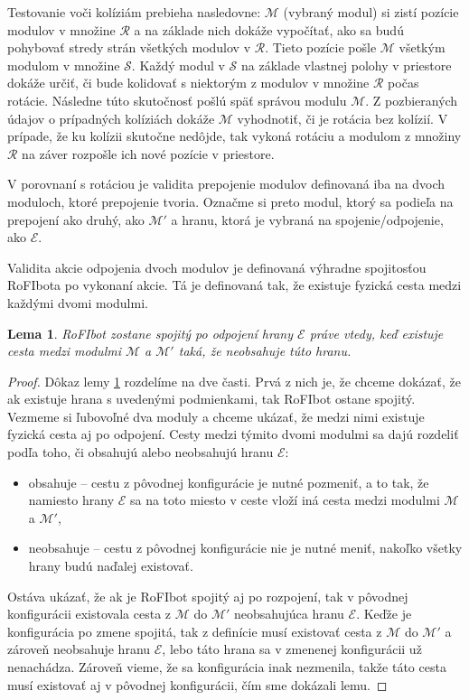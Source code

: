 \documentclass[
  digital, %
  oneside, %
  notable,   %
  lof,     %
  nolot,     %
]{fithesis3}
\newtheorem{lemma}{Lema}
\begin{document}
Testovanie voči kolíziám prebieha nasledovne: $\mathcal{M}$ (vybraný modul) si zistí pozície modulov v množine $\mathcal{R}$ a na základe nich dokáže vypočítať, ako sa budú pohybovať stredy strán všetkých modulov v $\mathcal{R}$. Tieto pozície pošle $\mathcal{M}$ všetkým modulom v množine $\mathcal{S}$. Každý modul v $\mathcal{S}$ na základe vlastnej polohy v priestore dokáže určiť, či bude kolidovať s niektorým z modulov v množine $\mathcal{R}$ počas rotácie. Následne túto skutočnosť pošlú späť správou modulu $\mathcal{M}$. Z pozbieraných údajov o prípadných kolíziách dokáže $\mathcal{M}$ vyhodnotiť, či je rotácia bez kolízií. V prípade, že ku kolízii skutočne nedôjde, tak vykoná rotáciu a modulom z množiny $\mathcal{R}$ na záver rozpošle ich nové pozície v priestore. 

V porovnaní s rotáciou je validita prepojenie modulov definovaná iba na dvoch moduloch, ktoré prepojenie tvoria. Označme si preto modul, ktorý sa podieľa na prepojení ako druhý, ako $\mathcal{M}'$ a hranu, ktorá je vybraná na spojenie/odpojenie, ako $\mathcal{E}$. 

Validita akcie odpojenia dvoch modulov je definovaná výhradne spojitosťou RoFIbota po vykonaní akcie. Tá je definovaná tak, že existuje fyzická cesta medzi každými dvomi modulmi. 

\begin{lemma}
\label{lemma:disconnection}
RoFIbot zostane spojitý po odpojení hrany $\mathcal{E}$ práve vtedy, keď existuje cesta medzi modulmi $\mathcal{M}$ a $\mathcal{M}'$ taká, že neobsahuje túto hranu. 
\end{lemma}

\begin{proof}
Dôkaz lemy \ref{lemma:disconnection} rozdelíme na dve časti. Prvá z nich je, že chceme dokázať, že ak existuje hrana s uvedenými podmienkami, tak RoFIbot ostane spojitý. Vezmeme si ľubovoľné dva moduly a chceme ukázať, že medzi nimi existuje fyzická cesta aj po odpojení. Cesty medzi týmito dvomi modulmi sa dajú rozdeliť podľa toho, či obsahujú alebo neobsahujú hranu $\mathcal{E}$: 
\begin{itemize}
    \item obsahuje -- cestu z pôvodnej konfigurácie je nutné pozmeniť, a to tak, že namiesto hrany $\mathcal{E}$ sa na toto miesto v ceste vloží iná cesta medzi modulmi $\mathcal{M}$ a $\mathcal{M}'$, 
    \item neobsahuje -- cestu z pôvodnej konfigurácie nie je nutné meniť, nakoľko všetky hrany budú naďalej existovať.
\end{itemize}

Ostáva ukázať, že ak je RoFIbot spojitý aj po rozpojení, tak v pôvodnej konfigurácii existovala cesta z $\mathcal{M}$ do $\mathcal{M}'$ neobsahujúca hranu $\mathcal{E}$. Keďže je konfigurácia po zmene spojitá, tak z definície musí existovať cesta z $\mathcal{M}$ do $\mathcal{M}'$ a zároveň neobsahuje hranu $\mathcal{E}$, lebo táto hrana sa v zmenenej konfigurácii už nenachádza. Zároveň vieme, že sa konfigurácia inak nezmenila, takže táto cesta musí existovať aj v pôvodnej konfigurácii, čím sme dokázali lemu. 

\end{proof}
\end{document}
